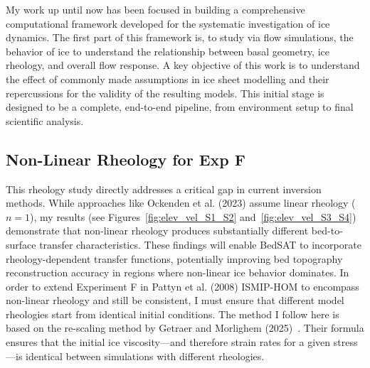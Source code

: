 My work up until now has been focused in building a comprehensive computational framework developed for the systematic investigation of ice dynamics. The first part of this framework is, to study via flow simulations, the behavior of ice to understand the relationship between basal geometry, ice rheology, and overall flow response. A key objective of this work is to understand the effect of commonly made assumptions in ice sheet modelling and their repercussions for the validity of the resulting models. This initial stage is designed to be a complete, end-to-end pipeline, from environment setup to final scientific analysis. 

\subsection{Non-Linear Rheology for Exp F}
This rheology study directly addresses a critical gap in current inversion methods. While approaches like Ockenden et al. (2023) assume linear rheology ($n=1$), my results (see Figures~\ref{fig:elev_vel_S1_S2} and~\ref{fig:elev_vel_S3_S4}) demonstrate that non-linear rheology produces substantially different bed-to-surface transfer characteristics. These findings will enable BedSAT to incorporate rheology-dependent transfer functions, potentially improving bed topography reconstruction accuracy in regions where non-linear ice behavior dominates.
In order to extend Experiment F in Pattyn et al. (2008) ISMIP-HOM to encompass non-linear rheology and still be consistent, I must ensure that different model rheologies start from identical initial conditions. The method I follow here is based on the re-scaling method by Getraer and Morlighem (2025)~\cite{Getraer_2025}. Their formula ensures that the initial ice viscosity—and therefore strain rates for a given stress—is identical between simulations with different rheologies.

